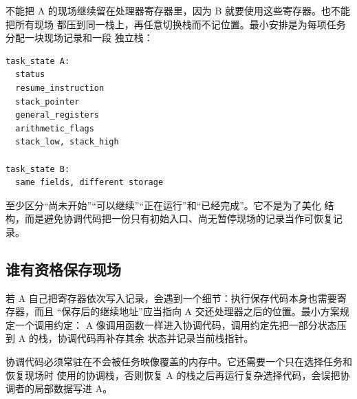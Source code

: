 不能把 A 的现场继续留在处理器寄存器里，因为 B 就要使用这些寄存器。也不能把所有现场
都压到同一栈上，再任意切换栈而不记位置。最小安排是为每项任务分配一块现场记录和一段
独立栈：

\begin{lstlisting}
task_state A:
  status
  resume_instruction
  stack_pointer
  general_registers
  arithmetic_flags
  stack_low, stack_high

task_state B:
  same fields, different storage
\end{lstlisting}

 至少区分“尚未开始”“可以继续”“正在运行”和“已经完成”。它不是为了美化
结构，而是避免协调代码把一份只有初始入口、尚无暂停现场的记录当作可恢复记录。

\subsection{谁有资格保存现场}

若 A 自己把寄存器依次写入记录，会遇到一个细节：执行保存代码本身也需要寄存器，而且
“保存后的继续地址”应当指向 A 交还处理器之后的位置。最小方案规定一个调用约定：
A 像调用函数一样进入协调代码，调用约定先把一部分状态压到 A 的栈，协调代码再补存其余
状态并记录当前栈指针。

协调代码必须常驻在不会被任务映像覆盖的内存中。它还需要一个只在选择任务和恢复现场时
使用的协调栈，否则恢复 A 的栈之后再运行复杂选择代码，会误把协调者的局部数据写进 A。

\begin{center}
\end{center}

